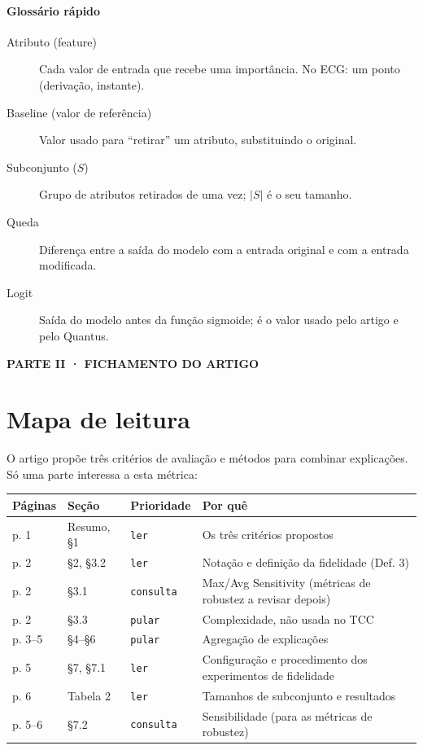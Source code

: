 \documentclass[11pt,a4paper]{article}
\newcommand{\readtag}[1]{\texttt{\small #1}}
\newcommand{\partbar}[1]{\par\vspace{1.2em}\noindent\colorbox{black!80}{\parbox{\dimexpr\linewidth-2\fboxsep}{\color{white}\bfseries\sffamily\MakeUppercase{#1}}}\par\vspace{0.4em}}
\begin{document}
\paragraph{Glossário rápido}
\begin{description}
\item[Atributo (feature)] Cada valor de entrada que recebe uma importância. No ECG: um ponto (derivação, instante).
\item[Baseline (valor de referência)] Valor usado para “retirar” um atributo, substituindo o original.
\item[Subconjunto ($S$)] Grupo de atributos retirados de uma vez; $|S|$ é o seu tamanho.
\item[Queda] Diferença entre a saída do modelo com a entrada original e com a entrada modificada.
\item[Logit] Saída do modelo antes da função sigmoide; é o valor usado pelo artigo e pelo Quantus.
\end{description}

\partbar{Parte II · Fichamento do artigo}

\section{Mapa de leitura}
O artigo propõe três critérios de avaliação e métodos para combinar explicações. Só uma parte interessa a esta métrica:
\begin{center}\small
\begin{tabularx}{\linewidth}{llll}
\toprule
\textbf{Páginas} & \textbf{Seção} & \textbf{Prioridade} & \textbf{Por quê} \\
\midrule
p. 1 & Resumo, §1 & \readtag{ler} & Os três critérios propostos \\
p. 2 & §2, §3.2 & \readtag{ler} & Notação e definição da fidelidade (Def. 3) \\
p. 2 & §3.1 & \readtag{consulta} & Max/Avg Sensitivity (métricas de robustez a revisar depois) \\
p. 2 & §3.3 & \readtag{pular} & Complexidade, não usada no TCC \\
p. 3--5 & §4--§6 & \readtag{pular} & Agregação de explicações \\
p. 5 & §7, §7.1 & \readtag{ler} & Configuração e procedimento dos experimentos de fidelidade \\
p. 6 & Tabela 2 & \readtag{ler} & Tamanhos de subconjunto e resultados \\
p. 5--6 & §7.2 & \readtag{consulta} & Sensibilidade (para as métricas de robustez) \\
\bottomrule
\end{tabularx}
\end{center}
\end{document}
